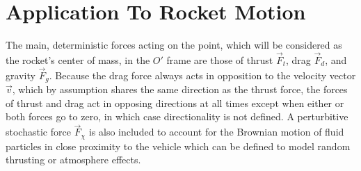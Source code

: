 \documentclass[11pt]{thesis}
\numberwithin{equation}{section}
\begin{document}
\section{Application To Rocket Motion}
The main, deterministic forces acting on the point, which will be considered as the rocket's center of mass, in the $\mathit{O'}$ frame are those of thrust $\vec{F}_t$, drag $\vec{F}_d$, and gravity $\vec{F}_g$. Because the drag force always acts in opposition to the velocity vector $\vec{v}$, which by assumption shares the same direction as the thrust force, the forces of thrust and drag act in opposing directions at all times except when either or both forces go to zero, in which case directionality is not defined. A perturbitive stochastic force $\vec{F}_{\chi}$ is also included to account for the Brownian motion of fluid particles in close proximity to the vehicle which can be defined to model random thrusting or atmosphere effects.
\end{document}
